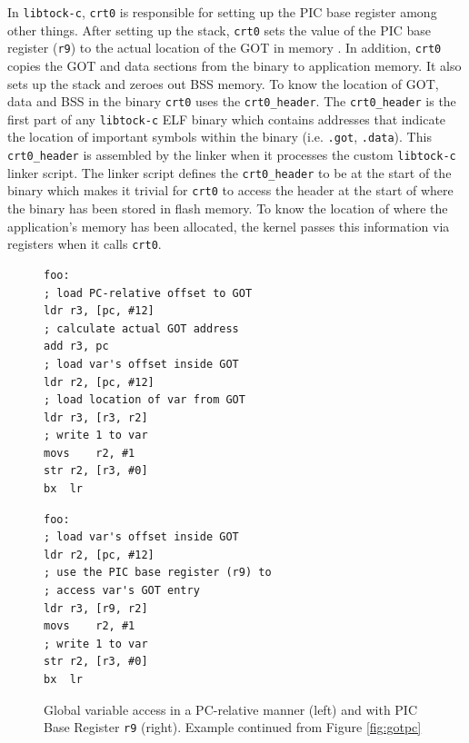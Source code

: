 \documentclass[12pt]{ucsddissertation}
\begin{document}
In \texttt{libtock-c}, \texttt{crt0} is responsible for setting up the PIC base register among other things. After setting up the stack, \texttt{crt0} sets the value of the PIC base register (\texttt{r9}) to the actual location of the GOT in memory \cite{libtock-c}. In addition, \texttt{crt0} copies the GOT and data sections from the binary to application memory. It also sets up the stack and zeroes out BSS memory. To know the location of GOT, data and BSS in the binary \texttt{crt0} uses the \texttt{crt0\_header}. The \texttt{crt0\_header} is the first part of any \texttt{libtock-c} ELF binary which contains addresses that indicate the location of important symbols within the binary (i.e. \texttt{.got}, \texttt{.data}). This \texttt{crt0\_header} is assembled by the linker when it processes the custom \texttt{libtock-c} linker script. The linker script defines the \texttt{crt0\_header} to be at the start of the binary which makes it trivial for \texttt{crt0} to access the header at the start of where the binary has been stored in flash memory. To know the location of where the application's memory has been allocated, the kernel passes this information via registers when it calls \texttt{crt0}.


\begin{figure}
\centering
 \begin{minipage}{0.47\textwidth}
\begin{verbatim}
foo:
; load PC-relative offset to GOT
ldr r3, [pc, #12]
; calculate actual GOT address 
add r3, pc
; load var's offset inside GOT
ldr r2, [pc, #12]
; load location of var from GOT
ldr r3, [r3, r2]
; write 1 to var
movs    r2, #1
str r2, [r3, #0]
bx  lr
\end{verbatim}
 \end{minipage}
 \begin{minipage}{0.47\textwidth}
    \begin{verbatim}
foo:
; load var's offset inside GOT
ldr r2, [pc, #12]
; use the PIC base register (r9) to
; access var's GOT entry
ldr r3, [r9, r2] 
movs    r2, #1
; write 1 to var
str r2, [r3, #0] 
bx  lr
    \end{verbatim}
 \end{minipage}
    \caption[Global Variable Access with PIC Base Register]{Global variable access in a PC-relative manner (left) and with PIC Base Register \texttt{r9} (right). Example continued from Figure \ref{fig:gotpc}}
    \label{fig:r9}
\end{figure}
\end{document}
